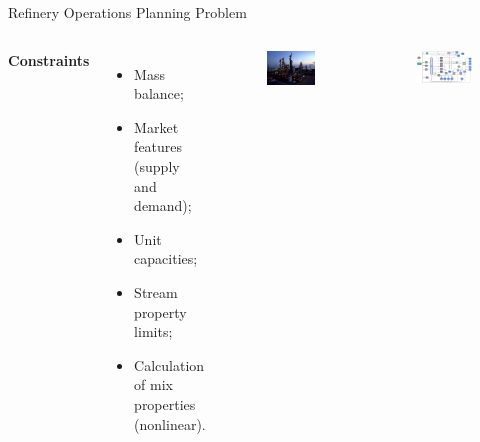 \begin{frame}{Refinery Operations Planning Problem}
\begin{columns}
{		{\bf Constraints}
			\begin{itemize}
				\item Mass balance;
			    \item Market features (supply and demand);
			    \item Unit capacities;
			    \item Stream property limits;
			    \item \alert{Calculation of mix properties (nonlinear)}.
		    \end{itemize}}
		\begin{figure}
			\includegraphics[width=\linewidth]{figures/Refinery.png}
		\end{figure}
		\begin{figure}
			\includegraphics[width=\linewidth]{figures/RefinerySchema.png}
		\end{figure}
	\end{columns}
\end{frame}


